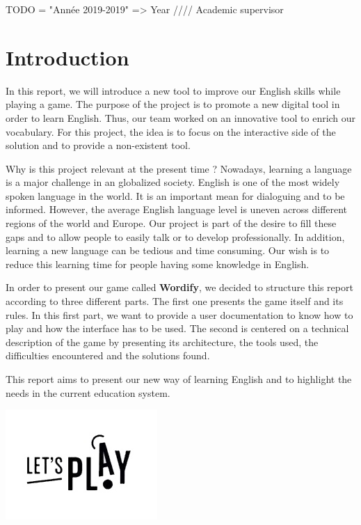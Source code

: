 \documentclass{tnreport}
\begin{document}
\maketitle
TODO = "Année 2019-2019" => Year //// Academic supervisor

\cleardoublepage

\renewcommand{\baselinestretch}{0.5}\normalsize
\tableofcontents
\renewcommand{\baselinestretch}{1.0}\normalsize

\cleardoublepage

\chapter{Introduction}

In this report, we will introduce a new tool to improve our English skills while playing a game. The purpose of the project is to promote a new digital tool in order to learn English. Thus, our team worked on an innovative tool to enrich our vocabulary. For this project, the idea is to focus on the interactive side of the solution and to provide a non-existent tool. 

Why is this project relevant at the present time ? Nowadays, learning a language is a major challenge in an globalized society. English is one of the most widely spoken language in the world. It is an important mean for dialoguing and to be informed. However, the average English language level is uneven across different regions of the world and Europe. Our project is part of the desire to fill these gaps and to allow people to easily talk or to develop professionally. In addition, learning a new language can be tedious and time consuming. Our wish is to reduce this learning time for people having some knowledge in English. 

In order to present our game called \textbf{Wordify}, we decided to structure this report according to three different parts. The first one presents the game itself and its rules. In this first part, we want to provide a user documentation to know how to play and how the interface has to be used. The second is centered on a technical description of the game by presenting its architecture, the tools used, the difficulties encountered and the solutions found.

This report aims to present our new way of learning English and to highlight the needs in the current education system. 

\begin{center}
	\includegraphics{figures/lets_play}
\end{center} 
\end{document}
